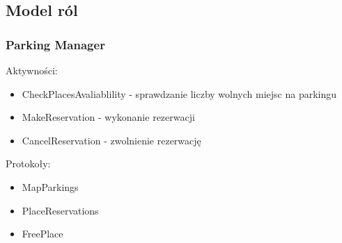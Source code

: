 \newpage
\subsection{Model ról}

\subsubsection{Parking Manager}

Aktywności:
\begin{itemize}
    \item CheckPlacesAvaliablility - sprawdzanie liczby wolnych miejsc na parkingu
    \item MakeReservation - wykonanie rezerwacji
    \item CancelReservation - zwolnienie rezerwację
\end{itemize}

Protokoły:
\begin{itemize}
    \item MapParkings
    \item PlaceReservations
    \item FreePlace
\end{itemize}


